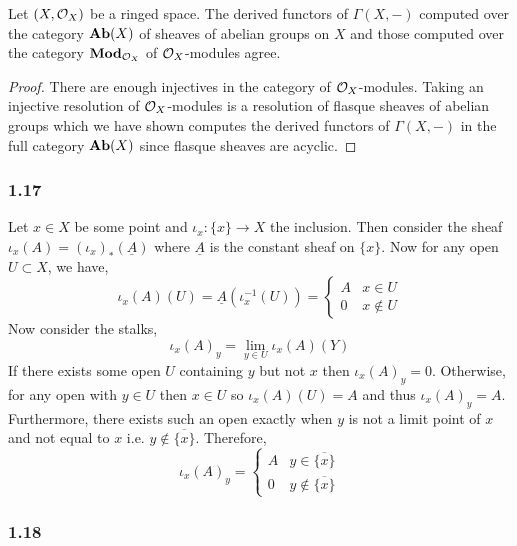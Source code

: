 \documentclass[12pt]{article}
\begin{document}
\begin{proposition}
Let $(X, \mathcal{O}_{X})$ be a ringed space. The derived functors of $\Gamma(X, -)$ computed over the category $\mathbf{Ab}(X)$ of sheaves of abelian groups on $X$ and those computed over the category $\mathbf{Mod}_{\mathcal{O}_{X}}$ of $\mathcal{O}_{X}$-modules agree. 
\end{proposition}

\begin{proof}
There are enough injectives in the category of $\mathcal{O}_{X}$-modules. Taking an injective resolution of $\mathcal{O}_{X}$-modules is a resolution  of flasque sheaves of abelian groups which we have shown computes the derived functors of $\Gamma(X, -)$ in the full category $\mathbf{Ab}(X)$ since flasque sheaves are acyclic. 
\end{proof}

\subsubsection{1.17}

Let $x \in X$ be some point and $\iota_x : \{ x \} \to X$ the inclusion. Then consider the sheaf $\iota_x(A) = (\iota_x)_*(\underline{A})$ where $\underline{A}$ is the constant sheaf on $\{ x \}$. Now for any open $U \subset X$, we have,
\[ \iota_x(A)(U) = \underline{A}(\iota_x^{-1}(U)) = \begin{cases}
A & x \in U
\\
0 & x \notin U
\end{cases} \] 
Now consider the stalks,
\[ \iota_x(A)_y = \lim_{y \in U} \iota_x(A)(Y) \]
If there exists some open $U$ containing $y$ but not $x$ then $\iota_x(A)_y = 0$. Otherwise, for any open with $y \in U$ then $x \in U$ so $\iota_x(A)(U) = A$ and thus $\iota_x(A)_y = A$. Furthermore, there exists such an open exactly when $y$ is not a limit point of $x$ and not equal to $x$ i.e. $y \notin \overline{\{ x \}}$. Therefore, 
\[ \iota_x(A)_y = \begin{cases}
A & y \in \overline{\{ x \}} 
\\
0 & y \notin \overline{\{ x \}}
\end{cases} \]

\subsubsection{1.18}
\end{document}
